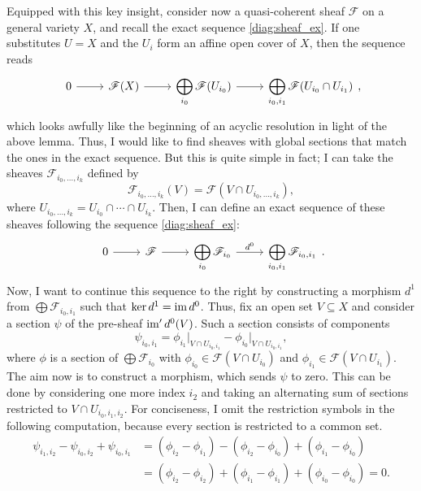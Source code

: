 Equipped with this key insight, consider now
a quasi-coherent sheaf $\mathscr{F}$ on a general variety $X$, and
recall the exact sequence \eqref{diag:sheaf_ex}. If one substitutes $U=X$
and the $U_{i}$ form an affine open cover of $X$, then the sequence reads
\[\begin{tikzcd}
    0\rar & \mathscr{F}(X)\rar
    & \displaystyle\bigoplus_{i_{0}}\mathscr{F}(U_{i_{0}})\rar
    & \displaystyle\bigoplus_{i_{0},i_{1}}\mathscr{F}(U_{i_{0}}\cap U_{i_{1}})
  \end{tikzcd},\]
which looks awfully like the beginning of an acyclic resolution in light of
the above lemma. Thus, I would like to find sheaves with global sections
that match the ones in the exact sequence. But this is quite simple in fact;
I can take the sheaves
$\mathscr{F}_{i_{0},\ldots,i_{k}}$ defined by
\[
  \mathscr{F}_{i_{0},\ldots,i_{k}}(V)=\mathscr{F}(V\cap
  U_{i_{0},\ldots,i_{k}}),
\]
where $U_{i_{0},\ldots, i_{k}}=U_{i_{0}}\cap\cdots\cap U_{i_{k}}$.
Then, I can define an exact sequence of these sheaves following the sequence
\eqref{diag:sheaf_ex}:
\[\begin{tikzcd}
    0\rar & \mathscr{F}\rar
    & \displaystyle\bigoplus_{i_{0}}\mathscr{F}_{i_{0}}\rar{d^{0}}
    & \displaystyle\bigoplus_{i_{0},i_{1}}\mathscr{F}_{i_{0},i_{1}}
  \end{tikzcd}.\]
Now, I want to continue this sequence to the right by constructing a
morphism $d^{1}$ from $\displaystyle\bigoplus\mathscr{F}_{i_{0},i_{1}}$
such that $\ker d^{1}=\operatorname{im} d^{0}$. Thus, fix an open set $V\subseteq X$ and
consider a section $\psi$ of the pre-sheaf $\operatorname{im}^{\prime} d^{0}(V)$. Such a
section consists of components
\[
  \psi_{i_{0},i_{1}}=\phi_{i_{1}}\vert_{V\cap U_{i_{0},i_{1}}}
  -\phi_{i_{0}}\vert_{V\cap U_{i_{0},i_{1}}},
\] %
where $\phi$ is a section of $\displaystyle\bigoplus\mathscr{F}_{i_{0}}$ with
$\phi_{i_{0}}\in\mathscr{F}(V\cap U_{i_{0}})$ and
$\phi_{i_{1}}\in\mathscr{F}(V\cap U_{i_{1}})$. The aim now is to construct a
morphism, which sends $\psi$ to zero. This can be done by considering one
more index $i_{2}$ and taking an alternating sum of sections restricted to
$V\cap U_{i_{0},i_{1},i_{2}}$. For conciseness, I omit the restriction symbols
in the following computation, because every section is restricted to a
common set.
\begin{align*}
  \psi_{i_{1},i_{2}}-\psi_{i_{0},i_{2}}+\psi_{i_{0},i_{1}}
  &=(\phi_{i_{2}}-\phi_{i_{1}})-(\phi_{i_{2}}-\phi_{i_{0}})
    +(\phi_{i_{1}}-\phi_{i_{0}}) \\
  &=(\phi_{i_{2}}-\phi_{i_{2}})+(\phi_{i_{1}}-\phi_{i_{1}})
    +(\phi_{i_{0}}-\phi_{i_{0}})=0.
\end{align*}
